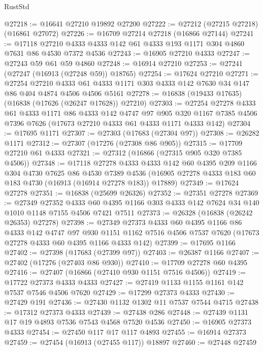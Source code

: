 \begin{lexlean}{RustStd}
\begin{coremodule}
@27218 := @16641 @27210 @19892 @27200
@27222 := @27212 (@27215 @27218) (@16861 @27072)
@27226 := @16709 @27214 @27218 (@16866 @27144)
@27241 := @17118 @27210 @4333 @4333 @142 @61 @4333 @193 @1171 @304 @4860 @7631 @86 @4530 @7372 @4536
@27243 := @16905 @27210 @4333
@27247 := @27243 @59 @61 @59 @4860
@27248 := @16914 @27210
@27253 := @27241 (@27247 (@16913 (@27248 @59)) @18765)
@27254 := @17624 @27210
@27271 := @27254
    @27210
    @4333
    @61
    @4333
    @1171
    @303
    @4333
    @142
    @7630
    @34
    @147
    @86
    @404
    @4874
    @4506
    @4506
    @5161
@27278 := @16838 (@19433 @17635) (@16838 (@17626 (@26247 @17628)) @27210)
@27303 := @27254
    @27278
    @4333
    @61
    @4333
    @1171
    @86
    @4333
    @142
    @4747
    @97
    @905
    @320
    @1167
    @7385
    @4506
    @7396
    @7626
    (@17673 @27210 @4333 @61 @4333 @1171 @4333 @142)
@27304 := @17695 @1171
@27307 := @27303 (@17683 (@27304 @97))
@27308 := @26282 @1171
@27312 := @27307 (@17276 (@27308 @86 @905))
@27315 := @17709 @27210 @61 @4333
@27321 := @27312 (@16866 (@27315 @905 @320 @7385 @4506))
@27348 := @17118
    @27278
    @4333
    @4333
    @142
    @60
    @4395
    @209
    @1166
    @304
    @4730
    @7625
    @86
    @4530
    @7389
    @4536
    (@16905 @27278 @4333 @183 @60 @183 @4730 (@16913 (@16914 @27278 @183)) @17889)
@27349 := @17624 @27278
@27351 := @16838 (@25699 @26326)
@27352 := @27351 @27278
@27369 := @27349
    @27352
    @4333
    @60
    @4395
    @1166
    @303
    @4333
    @142
    @7624
    @34
    @140
    @1010
    @1148
    @7155
    @4506
    @7421
    @7511
@27373 := @26328 (@16838 (@26242 @26353) @27278)
@27398 := @27349
    @27373
    @4333
    @60
    @4395
    @1166
    @86
    @4333
    @142
    @4747
    @97
    @930
    @1151
    @1162
    @7516
    @4506
    @7537
    @7620
    (@17673 @27278 @4333 @60 @4395 @1166 @4333 @142)
@27399 := @17695 @1166
@27402 := @27398 (@17683 (@27399 @97))
@27403 := @26387 @1166
@27407 := @27402 (@17276 (@27403 @86 @930))
@27410 := @17709 @27278 @60 @4395
@27416 := @27407 (@16866 (@27410 @930 @1151 @7516 @4506))
@27419 := @17722 @27373 @4333 @4333
@27427 := @27419 @1133 @1155 @1161 @142 @7537 @7546 @4506 @7620
@27429 := @17299 @27373 @4333
@27430 := @27429 @191
@27436 := @27430 @1132 @1302 @11 @7537 @7544 @4715
@27438 := @17312 @27373 @4333
@27439 := @27438 @286
@27448 := @27439 @1131 @17 @19 @4893 @7536 @7543 @4568 @7520 @4536
@27450 := @16905 @27373 @4333
@27454 := @27450 @117 @17 @117 @4893
@27455 := @16914 @27373
@27459 := @27454 (@16913 (@27455 @117)) @18897
@27460 := @27448 @27459

\end{coremodule}
\end{lexlean}
